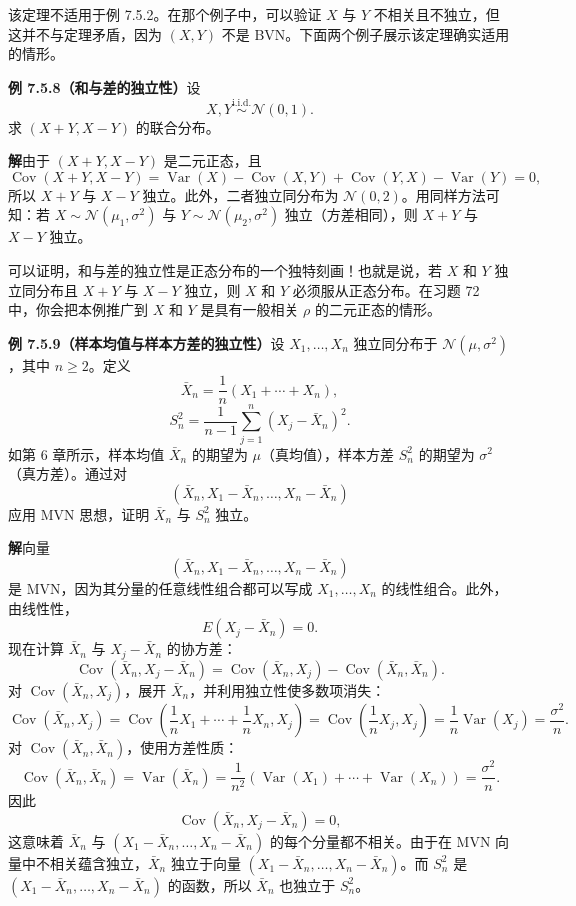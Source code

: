 \documentclass[UTF8, 12pt, fontset=fandol, oneside]{ctexart}
\begin{document}
该定理不适用于例 7.5.2。在那个例子中，可以验证 $X$ 与 $Y$ 不相关且不独立，但这并不与定理矛盾，因为 $(X,Y)$ 不是 BVN。下面两个例子展示该定理确实适用的情形。

\noindent\textbf{例 7.5.8（和与差的独立性）}\quad 设
\[
  X,Y\stackrel{\text{i.i.d.}}{\sim}\mathcal{N}(0,1).
\]
求 $(X+Y,X-Y)$ 的联合分布。

\noindent\textbf{解}\quad 由于 $(X+Y,X-Y)$ 是二元正态，且
\[
  \operatorname{Cov}(X+Y,X-Y)
  =\operatorname{Var}(X)-\operatorname{Cov}(X,Y)+\operatorname{Cov}(Y,X)-\operatorname{Var}(Y)=0,
\]
所以 $X+Y$ 与 $X-Y$ 独立。此外，二者独立同分布为 $\mathcal{N}(0,2)$。用同样方法可知：若 $X\sim \mathcal{N}(\mu_1,\sigma^2)$ 与 $Y\sim \mathcal{N}(\mu_2,\sigma^2)$ 独立（方差相同），则 $X+Y$ 与 $X-Y$ 独立。

可以证明，和与差的独立性是正态分布的一个独特刻画！也就是说，若 $X$ 和 $Y$ 独立同分布且 $X+Y$ 与 $X-Y$ 独立，则 $X$ 和 $Y$ 必须服从正态分布。在习题 72 中，你会把本例推广到 $X$ 和 $Y$ 是具有一般相关 $\rho$ 的二元正态的情形。

\noindent\textbf{例 7.5.9（样本均值与样本方差的独立性）}\quad 设 $X_1,\ldots,X_n$ 独立同分布于 $\mathcal{N}(\mu,\sigma^2)$，其中 $n\ge 2$。定义
\[
  \bar X_n=\frac1n(X_1+\cdots+X_n),
\]
\[
  S_n^2=\frac{1}{n-1}\sum_{j=1}^{n}(X_j-\bar X_n)^2.
\]
如第 6 章所示，样本均值 $\bar X_n$ 的期望为 $\mu$（真均值），样本方差 $S_n^2$ 的期望为 $\sigma^2$（真方差）。通过对
\[
  (\bar X_n,X_1-\bar X_n,\ldots,X_n-\bar X_n)
\]
应用 MVN 思想，证明 $\bar X_n$ 与 $S_n^2$ 独立。

\noindent\textbf{解}\quad 向量
\[
  (\bar X_n,X_1-\bar X_n,\ldots,X_n-\bar X_n)
\]
是 MVN，因为其分量的任意线性组合都可以写成 $X_1,\ldots,X_n$ 的线性组合。此外，由线性性，
\[
  E(X_j-\bar X_n)=0.
\]
现在计算 $\bar X_n$ 与 $X_j-\bar X_n$ 的协方差：
\[
  \operatorname{Cov}(\bar X_n,X_j-\bar X_n)
  =\operatorname{Cov}(\bar X_n,X_j)-\operatorname{Cov}(\bar X_n,\bar X_n).
\]
对 $\operatorname{Cov}(\bar X_n,X_j)$，展开 $\bar X_n$，并利用独立性使多数项消失：
\[
  \operatorname{Cov}(\bar X_n,X_j)
  =\operatorname{Cov}\left(\frac1nX_1+\cdots+\frac1nX_n,X_j\right)
  =\operatorname{Cov}\left(\frac1nX_j,X_j\right)
  =\frac1n\operatorname{Var}(X_j)
  =\frac{\sigma^2}{n}.
\]
对 $\operatorname{Cov}(\bar X_n,\bar X_n)$，使用方差性质：
\[
  \operatorname{Cov}(\bar X_n,\bar X_n)
  =\operatorname{Var}(\bar X_n)
  =\frac{1}{n^2}\left(\operatorname{Var}(X_1)+\cdots+\operatorname{Var}(X_n)\right)
  =\frac{\sigma^2}{n}.
\]
因此
\[
  \operatorname{Cov}(\bar X_n,X_j-\bar X_n)=0,
\]
这意味着 $\bar X_n$ 与 $(X_1-\bar X_n,\ldots,X_n-\bar X_n)$ 的每个分量都不相关。由于在 MVN 向量中不相关蕴含独立，$\bar X_n$ 独立于向量 $(X_1-\bar X_n,\ldots,X_n-\bar X_n)$。而 $S_n^2$ 是 $(X_1-\bar X_n,\ldots,X_n-\bar X_n)$ 的函数，所以 $\bar X_n$ 也独立于 $S_n^2$。
\end{document}
